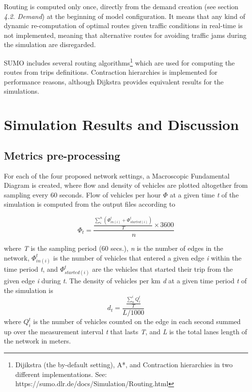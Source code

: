 \documentclass[11pt]{article}
\begin{document}

Routing is computed only once, directly from the demand creation (see section \textit{4.2. Demand}) at the beginning of model configuration. It means that any kind of dynamic re-computation of optimal routes given traffic conditions in real-time is not implemented, meaning that alternative routes for avoiding traffic jams during the simulation are disregarded. 

SUMO includes several routing algorithms\footnote{Dijikstra (the by-default setting), A*, and Contraction hierarchies in two different implementations. See: https://sumo.dlr.de/docs/Simulation/Routing.html} which are used for computing the routes from trips definitions. Contraction hierarchies is implemented for performance reasons, although Dijkstra provides equivalent results for the simulations.

\section{Simulation Results and Discussion}
\subsection{Metrics pre-processing}
For each of the four proposed network settings, a Macroscopic Fundamental Diagram is created, where flow and density of vehicles are plotted altogether from sampling every 60 seconds. 
Flow of vehicles per hour $\Phi$ at a given time \textit{t} of the simulation is computed from the output files according to

\begin{equation}
\Phi _t = \frac{\frac{\sum_{i}^{n}(\Phi_{in(i)}^t+\Phi_{started(i)}^t)}{T}\times 3600}{n}
\end{equation}

where \textit{T} is the sampling period (60 secs.), \textit{n} is the number of edges in the network, $\Phi_{in(i)}^t$ is the number of vehicles that entered a given edge \textit{i} within the time period \textit{t}, and $\Phi_{started(i)}^t$ are the vehicles that started their trip from the given edge \textit{i} during \textit{t}.
The density of vehicles per km \textit{d} at a given time period \textit{t} of the simulation is
\begin{equation}
    d_t= \frac{\frac{\sum_{n}^{i}Q_{i}^t}{T}}{L/1000}
\end{equation}
where $Q_{i}^t$ is the number of vehicles counted on the edge in each second summed up over the measurement interval \textit{t} that lasts \textit{T}, and \textit{L} is the total lanes length of the network in meters.
\end{document}
